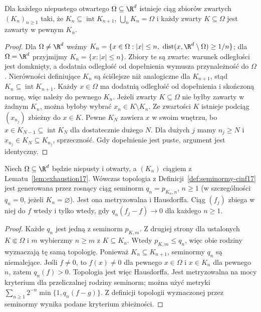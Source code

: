 \begin{lemat}
\label{lem:exhaustion17}
Dla każdego niepustego otwartego $\Omega\subseteq\R^d$ istnieje
ciąg zbiorów zwartych $(K_n)_{n\ge1}$ taki, że
$K_n\subseteq\operatorname{int}K_{n+1}$, $\bigcup_nK_n=\Omega$
i każdy zwarty $K\subseteq\Omega$ jest zawarty w pewnym $K_n$.
\end{lemat}
\begin{proof}
Dla $\Omega\ne\R^d$ weźmy
$K_n=\{x\in\Omega:|x|\le n,\
\operatorname{dist}(x,\R^d\setminus\Omega)\ge1/n\}$;
dla $\Omega=\R^d$ przyjmijmy $K_n=\{x:|x|\le n\}$.
Zbiory te są zwarte: warunek odległości jest domknięty,
a dodatnia odległość od dopełnienia wymusza przynależność do $\Omega$.
Nierówności definiujące $K_n$ są ściślejsze niż analogiczne dla
$K_{n+1}$, stąd $K_n\subseteq\operatorname{int}K_{n+1}$.
Każdy $x\in\Omega$ ma dodatnią odległość od dopełnienia
i skończoną normę, więc należy do pewnego $K_n$.
Jeżeli zwarty $K\subseteq\Omega$ nie byłby zawarty w żadnym $K_n$,
można byłoby wybrać $x_n\in K\setminus K_n$.
Ze zwartości $K$ istnieje podciąg $(x_{n_j})$ zbieżny
do $x\in K$. Pewne $K_N$ zawiera $x$ w swoim wnętrzu,
bo $x\in K_{N-1}\subseteq\operatorname{int}K_N$
dla dostatecznie dużego $N$.
Dla dużych $j$ mamy $n_j\ge N$ i $x_{n_j}\in K_N\subseteq K_{n_j}$,
sprzeczność. Gdy dopełnienie jest puste, argument jest identyczny.
\end{proof}

\begin{twierdzenie}
\label{thm:countable-cinf17}
Niech $\Omega\subseteq\R^d$ będzie niepusty i otwarty,
a $(K_n)$ ciągiem z Lematu~\ref{lem:exhaustion17}.
Wówczas topologia z Definicji~\ref{def:seminormy-cinf17}
jest generowana przez rosnący ciąg seminorm
$q_n=p_{K_n,n}$, $n\ge1$ (w szczególności $q_n=0$,
jeżeli $K_n=\varnothing$). Jest ona metryzowalna i Hausdorffa.
Ciąg $(f_j)$ zbiega w niej do $f$ wtedy i tylko wtedy, gdy
$q_n(f_j-f)\to0$ dla każdego $n\ge1$.
\end{twierdzenie}
\begin{proof}
Każde $q_n$ jest jedną z seminorm $p_{K,m}$.
Z drugiej strony dla ustalonych $K\Subset\Omega$ i $m$
wybierzmy $n\ge m$ z $K\subseteq K_n$.
Wtedy $p_{K,m}\le q_n$, więc obie rodziny wyznaczają tę samą
topologię. Ponieważ $K_n\subseteq K_{n+1}$, seminormy $q_n$
są niemalejące. Jeśli $f\ne0$, to $f(x)\ne0$ dla pewnego
$x\in\Omega$ i $x\in K_n$ dla pewnego $n$, zatem $q_n(f)>0$.
Topologia jest więc Hausdorffa. Jest metryzowalna na mocy
kryterium dla przeliczalnej rodziny seminorm; można użyć metryki
$\sum_{n\ge1}2^{-n}\min\{1,q_n(f-g)\}$.
Z definicji topologii wyznaczonej przez seminormy wynika
podane kryterium zbieżności.
\end{proof}

